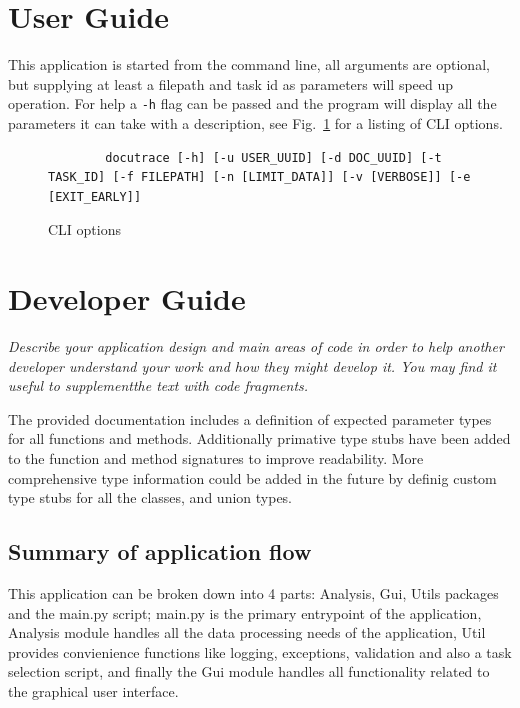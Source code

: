 \documentclass[11pt]{article}
\newcommand{\code}[1]{\colorbox{light-gray}{\texttt{#1}}}
\begin{document}
\section{User Guide}
This application is started from the command line, all arguments are optional, but supplying at least a filepath and task id as parameters will speed up operation. For help a \code{-h} flag can be passed and the program will display all the parameters it can take with a description, see Fig.~\ref{fig:CLIOpts} for a listing of CLI options.
\begin{figure}[h]
    \begin{verbatim}
        docutrace [-h] [-u USER_UUID] [-d DOC_UUID] [-t TASK_ID] [-f FILEPATH] [-n [LIMIT_DATA]] [-v [VERBOSE]] [-e [EXIT_EARLY]]
    \end{verbatim}
    \caption{CLI options}
    \label{fig:CLIOpts}
\end{figure}



\section{Developer Guide}
\emph{Describe your application design and main areas of code in order to help another developer understand your work and how they might develop it. You may find it useful to supplementthe text with code fragments.}

The provided documentation includes a definition of expected parameter types for all functions and methods. 
Additionally primative type stubs have been added to the function and method signatures to improve readability.
More comprehensive type information could be added in the future by definig custom type stubs for all the classes, and union types.


\subsection{Summary of application flow}
This application can be broken down into 4 parts: Analysis, Gui, Utils packages and the main.py script; 
main.py is the primary entrypoint of the application, Analysis module handles all the data processing needs of the application, Util provides convienience functions like logging, exceptions, validation and also a task selection script, and finally the Gui module handles all functionality related to the graphical user interface. 
\end{document}

